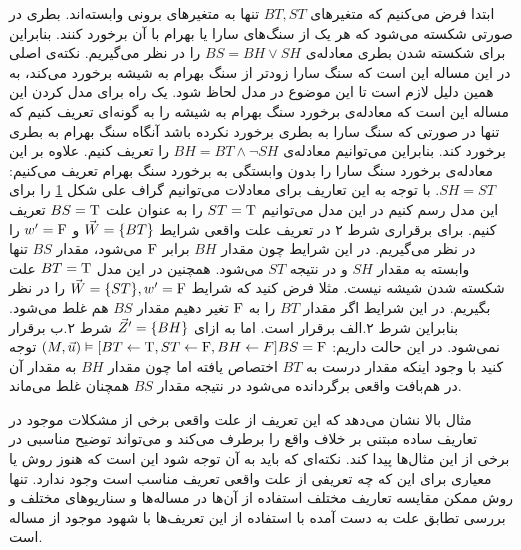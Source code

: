 \begin{figure}
      \centering
      \caption{}
      \label{fig:hp:sb}
\end{figure}
ابتدا فرض می‌کنیم که متغیر‌های
$BT,ST$
تنها به متغیر‌های برونی وابسته‌اند.
بطری در صورتی شکسته می‌شود که هر یک از سنگ‌های سارا یا بهرام با آن برخورد کنند.
بنابراین برای شکسته شدن بطری معادله‌ی
$BS = BH \vee SH$
را در نظر می‌گیریم.
نکته‌ی اصلی در این مساله این است که سنگ سارا زودتر از سنگ بهرام به شیشه برخورد می‌کند، به همین دلیل لازم است تا این موضوع در مدل لحاظ شود.
یک راه برای مدل کردن این مساله این است که معادله‌ی برخورد سنگ بهرام به شیشه را به گونه‌ای تعریف کنیم که تنها در صورتی که سنگ سارا به بطری برخورد نکرده باشد آنگاه سنگ بهرام به بطری برخورد کند.
بنابراین می‌توانیم معادله‌ی
$BH = BT \wedge \neg SH$
را تعریف کنیم.
علاوه بر این معادله‌ی برخورد سنگ سارا را بدون وابستگی به برخورد سنگ بهرام تعریف می‌کنیم:
$SH = ST$.
با توجه به این تعاریف برای معادلات می‌توانیم گراف علی شکل
\ref{fig:hp:sb}
را برای این مدل رسم کنیم
در این مدل می‌توانیم
$ST = \mathrm{T}$
را به عنوان علت
$BS = \mathrm{T}$
تعریف کنیم.
برای برقراری شرط ۲ در تعریف علت واقعی شرایط
$\vec W = \{BT\}$
و
$w' = \mathrm{F}$
را در نظر می‌گیریم.
در این شرایط چون مقدار
$BH$
برابر
$\mathrm{F}$
می‌شود، مقدار
$BS$
تنها وابسته به مقدار
$SH$
و در نتیجه
$ST$
می‌شود.
همچنین در این مدل
$BT = \mathrm{T}$
علت شکسته شدن شیشه نیست.
مثلا فرض کنید که شرایط
$\vec W = \{ST\},w' = \mathrm{F}$
را در نظر بگیریم.
در این شرایط اگر مقدار
$BT$
را به
$\mathrm{F}$
تغیر دهیم مقدار
$BS$
هم غلط می‌شود.
بنابراین شرط ۲.الف برقرار است.
اما به ازای
$\vec Z' = \{BH\}$
شرط ۲.ب برقرار نمی‌شود.
در این حالت داریم:
$(M,\vec{u})\vDash[BT \leftarrow \mathrm{T},ST \leftarrow \mathrm{F},BH \leftarrow F]BS = \mathrm{F}$
توجه کنید با وجود اینکه مقدار درست به
$BT$
اختصاص یافته اما چون مقدار
$BH$
به مقدار آن در هم‌بافت واقعی برگردانده می‌شود در نتیجه مقدار
$BS$
همچنان غلط می‌ماند.

مثال بالا نشان می‌دهد که این تعریف از علت واقعی برخی از مشکلات موجود در تعاریف ساده مبتنی بر خلاف واقع را برطرف می‌کند و می‌تواند توضیح مناسبی در برخی از این مثال‌ها پیدا کند.
نکته‌ای که باید به آن توجه شود این است که هنوز روش یا معیاری برای این که چه تعریفی از علت واقعی تعریف مناسب است وجود ندارد.
تنها روش ممکن مقایسه تعاریف مختلف استفاده از آن‌ها در مساله‌ها و سناریوهای مختلف و بررسی تطابق علت به دست آمده با استفاده از این تعریف‌ها با شهود موجود از مساله است.

